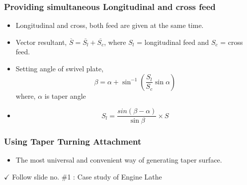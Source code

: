 \documentclass{article}
\begin{document}
\subsubsection*{Providing simultaneous Longitudinal and cross feed}
\begin{itemize}
  \item Longitudinal and cross, both feed are given at the same time.  
  \item Vector resultant, $\overline{S} = \overline{S_l} + \overline{S_c}$, where $S_l$ = longitudinal feed and $S_c$ = cross feed. 
  \item Setting angle of swivel plate, $$\beta = \alpha + \sin^{-1} \left(\frac{S_l}{S_c} \sin \alpha \right)$$ where, $\alpha$ is taper angle 
  \item $$S_l = \frac{sin \left(\beta - \alpha \right)}{\sin \beta} \times S $$
\end{itemize}

\subsubsection*{Using Taper Turning Attachment}
\begin{itemize}
  \item The most universal and convenient way of generating taper surface. 
\end{itemize}

\vspace*{1cm}
$\checkmark$ Follow slide no. \#1 : Case study of Engine Lathe 
\end{document}
